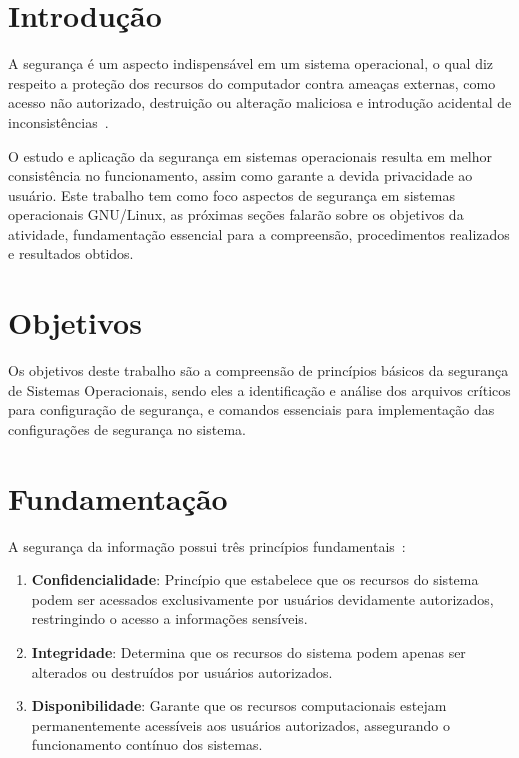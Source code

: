 \documentclass[
  12pt,				%
  oneside,   	        %
  a4paper,			%
  english,			%
  french,				%
  spanish,			%
  brazil,				%
  ]{pacotes/abntex2}
\begin{document}
\tableofcontents*
\cleardoublepage

\textual

\makeatletter
\renewcommand{\chapter}{\@gobbletwo}
\makeatother

\section{Introdução}
\label{sec:introducao}

A segurança é um aspecto indispensável em um sistema operacional, o qual diz respeito a proteção dos recursos do computador contra ameaças externas, como acesso não autorizado, destruição ou alteração maliciosa e introdução acidental de inconsistências~\cite{silberschatz2015}.

O estudo e aplicação da segurança em sistemas operacionais resulta em melhor consistência no funcionamento, assim como garante a devida privacidade ao usuário. Este trabalho tem como foco aspectos de segurança em sistemas operacionais GNU/Linux, as próximas seções falarão sobre os objetivos da atividade, fundamentação essencial para a compreensão, procedimentos realizados e resultados obtidos.

\section{Objetivos}
\label{sec:objetivos}

Os objetivos deste trabalho são a compreensão de princípios básicos da segurança de Sistemas Operacionais, sendo eles a identificação e análise dos arquivos críticos para configuração de segurança, e comandos essenciais para implementação das configurações de segurança no sistema.

\section{Fundamentação}
\label{sec:fundamentacao}

A segurança da informação possui três princípios fundamentais~\cite{maziero2019}:
\begin{enumerate}
    \item \textbf{Confidencialidade}: Princípio que estabelece que os recursos do sistema podem ser acessados exclusivamente por usuários devidamente autorizados, restringindo o acesso a informações sensíveis.
    \item \textbf{Integridade}: Determina que os recursos do sistema podem apenas ser alterados ou destruídos por usuários autorizados.
    \item \textbf{Disponibilidade}: Garante que os recursos computacionais estejam permanentemente acessíveis aos usuários autorizados, assegurando o funcionamento contínuo dos sistemas.
\end{enumerate}
\end{document}
